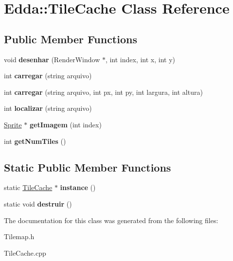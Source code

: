 \hypertarget{class_edda_1_1_tile_cache}{
\section{Edda::TileCache Class Reference}
\label{class_edda_1_1_tile_cache}
}
\subsection*{Public Member Functions}
\begin{DoxyCompactItemize}
\item 
\hypertarget{class_edda_1_1_tile_cache_a6e4ce40b733c801d0e91003a772a0b1e}{
void {\bfseries desenhar} (RenderWindow $\ast$, int index, int x, int y)}
\label{class_edda_1_1_tile_cache_a6e4ce40b733c801d0e91003a772a0b1e}

\item 
\hypertarget{class_edda_1_1_tile_cache_afdb29418165b34a31acac9141e6ad86a}{
int {\bfseries carregar} (string arquivo)}
\label{class_edda_1_1_tile_cache_afdb29418165b34a31acac9141e6ad86a}

\item 
\hypertarget{class_edda_1_1_tile_cache_ab557295393831656906de2beae510097}{
int {\bfseries carregar} (string arquivo, int px, int py, int largura, int altura)}
\label{class_edda_1_1_tile_cache_ab557295393831656906de2beae510097}

\item 
\hypertarget{class_edda_1_1_tile_cache_a99411c6e969c40a74f11c1359e013005}{
int {\bfseries localizar} (string arquivo)}
\label{class_edda_1_1_tile_cache_a99411c6e969c40a74f11c1359e013005}

\item 
\hypertarget{class_edda_1_1_tile_cache_aa35a22d04966b02a1172e0c30d1785eb}{
\hyperlink{class_edda_1_1_sprite}{Sprite} $\ast$ {\bfseries getImagem} (int index)}
\label{class_edda_1_1_tile_cache_aa35a22d04966b02a1172e0c30d1785eb}

\item 
\hypertarget{class_edda_1_1_tile_cache_a3f86ee3d88a6718a0ba5e3768b8970d5}{
int {\bfseries getNumTiles} ()}
\label{class_edda_1_1_tile_cache_a3f86ee3d88a6718a0ba5e3768b8970d5}

\end{DoxyCompactItemize}
\subsection*{Static Public Member Functions}
\begin{DoxyCompactItemize}
\item 
\hypertarget{class_edda_1_1_tile_cache_a5863f2e38ab77273c33419bb5327f89d}{
static \hyperlink{class_edda_1_1_tile_cache}{TileCache} $\ast$ {\bfseries instance} ()}
\label{class_edda_1_1_tile_cache_a5863f2e38ab77273c33419bb5327f89d}

\item 
\hypertarget{class_edda_1_1_tile_cache_a7558ff2cd52db59d3c95517a0ab6a39c}{
static void {\bfseries destruir} ()}
\label{class_edda_1_1_tile_cache_a7558ff2cd52db59d3c95517a0ab6a39c}

\end{DoxyCompactItemize}


The documentation for this class was generated from the following files:\begin{DoxyCompactItemize}
\item 
Tilemap.h\item 
TileCache.cpp\end{DoxyCompactItemize}
